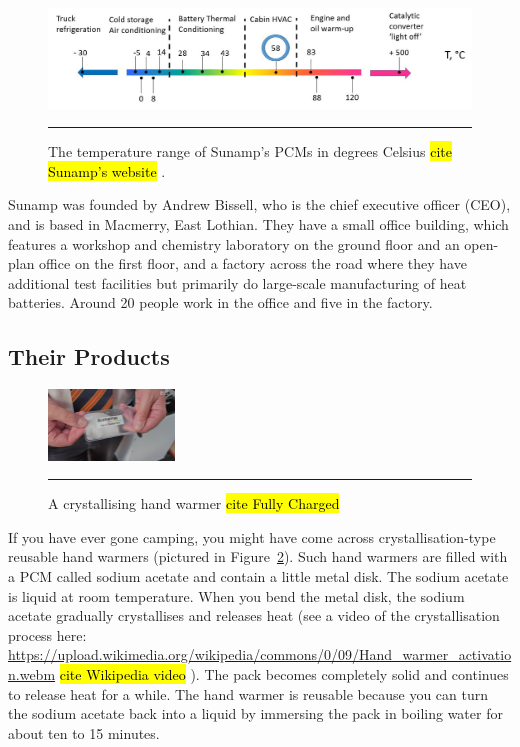 \begin{figure}[htbp]
	\centering
	\includegraphics[width=\textwidth]{figures/temperature-range-of-PCMs.jpg}
	\rule{\textwidth}{0.5pt} %
	\caption{The temperature range of Sunamp's PCMs in degrees Celsius \hl{cite Sunamp's website}
		.}
	\label{pcm_temp_range}
\end{figure}


Sunamp was founded by Andrew Bissell, who is the chief executive officer (CEO), and is based in Macmerry, East Lothian.
They have a small office building, which features a workshop and chemistry laboratory on the ground floor and an open-plan office on the first floor, and a factory across the road where they have additional test facilities but primarily do large-scale manufacturing %
of heat batteries.
Around 20 people work in the office and five in the factory.


\subsection*{Their Products}

\begin{figure}
	\includegraphics[width=0.3\textwidth]{figures/sunamp-hand-warmer.png}
	\rule{0.3\textwidth}{0.5pt} %
	\caption{A crystallising hand warmer \hl{cite Fully Charged} 
	}
	\label{fig:handwarmer}
\end{figure}

If you have ever gone camping, you might have come across crystallisation-type reusable hand warmers (pictured in Figure~\ref{fig:handwarmer}).
Such hand warmers are filled with a PCM called sodium acetate and contain a little metal disk.
The sodium acetate is liquid at room temperature.
When you bend the metal disk, the sodium acetate gradually crystallises and releases heat 
(see a video of the crystallisation process here: 
\url{https://upload.wikimedia.org/wikipedia/commons/0/09/Hand_warmer_activation.webm} \hl{cite Wikipedia video}
).
The pack becomes completely solid and continues to release heat for a while.
The hand warmer is reusable because you can turn the sodium acetate back into a liquid by immersing the pack in boiling water for about ten to 15 minutes.

